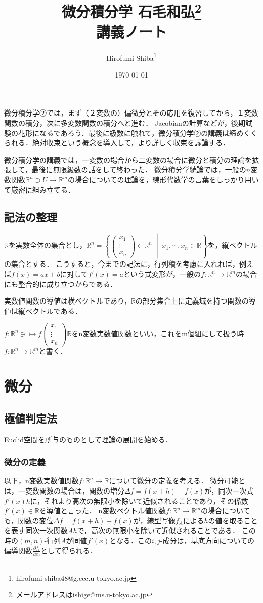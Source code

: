 \documentclass[uplatex, dvipdfmx]{jsreport}
\title{微分積分学 石毛和弘\thanks{メールアドレスはishige@ms.u-tokyo.ac.jp} \\ 講義ノート}
\author{Hirofumi Shiba\thanks{hirofumi-shiba48@g.ecc.u-tokyo.ac.jp}}
\date{\today}
\begin{document}
\tableofcontents

微分積分学②では，まず（２変数の）偏微分とその応用を復習してから，１変数関数の積分，次に多変数関数の積分へと進む．
Jacobianの計算などが，後期試験の花形になるであろう．最後に級数に触れて，微分積分学②の講義は締めくくられる．絶対収束という概念を導入して，より詳しく収束を議論する．

微分積分学の講義では，一変数の場合から二変数の場合に微分と積分の理論を拡張して，最後に無限級数の話をして終わった．
微分積分学続論では，一般の$n$変数関数$\mathbb{R}^n\supset U\to\mathbb{R}^m$の場合についての理論を，線形代数学の言葉をしっかり用いて厳密に組み立てる．

\chapter*{記法の整理}
$\mathbb{R}$を実数全体の集合とし，$\mathbb{R}^n=\left\{\left(\begin{array}{c}
    x_1 \\ \vdots \\ x_n
\end{array}\right)\in\mathbb{R}^n\;\middle| \;x_1,\cdots,x_n\in\mathbb{R} \right\}$を，縦ベクトルの集合とする．
こうすると，今までの記法に，行列積を考慮に入れれば，例えば$f(x)=ax+b$に対して$f'(x)=a$という式変形が，一般の$f:\mathbb{R}^n\to\mathbb{R}^m$の場合にも整合的に成り立つからである．

実数値関数の導値は横ベクトルであり，$\mathbb{R}$の部分集合上に定義域を持つ関数の導値は縦ベクトルである．

$f:\mathbb{R}^n\ni\mapsto f\left(\begin{array}{c}
    x_1 \\ \vdots \\ x_n
\end{array}\right)\mathbb{R}$をn変数実数値関数といい，これをm個組にして扱う時$f:\mathbb{R}^n\to\mathbb{R}^m$と書く．

\part{微分}
\chapter{極値判定法}
Euclid空間を所与のものとして理論の展開を始める．

\section{微分の定義}
以下，n変数実数値関数$f:\mathbb{R}^n\to\mathbb{R}$について微分の定義を考える．
微分可能とは，一変数関数の場合は，関数の増分$\Delta f=f(x+h)-f(x)$が，同次一次式$f'(x)h$に，それより高次の無限小を除いて近似されることであり，その係数$f'(x)\in\mathbb{R}$を導値と言った．
n変数ベクトル値関数$f:\mathbb{R}^n\to\mathbb{R}^m$の場合についても，関数の変位$\Delta f=f(x+h)-f(x)$が，線型写像$f_A$による$h$の値を取ることを表す同次一次関数$Ah$で，高次の無限小を除いて近似されることである．
この時の$(m,n)$-行列$A$が同値$f'(x)$となる．この$i,j$-成分は，基底方向についての偏導関数$\frac{\partial f_i}{\partial x_j}$として得られる．
\end{document}
